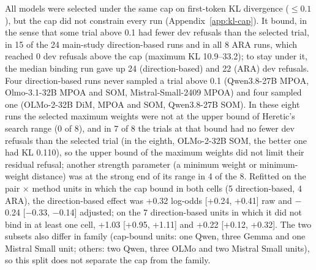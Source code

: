 All models were selected under the same cap on first-token KL divergence
($\le 0.1$), but the cap did not constrain every run
(Appendix~\ref{app:kl-cap}). It bound, in the sense that some trial above 0.1
had fewer dev refusals than the selected trial, in 15 of the 24 main-study
direction-based runs and in all 8 ARA runs, which reached 0 dev refusals above
the cap (maximum KL 10.9--33.2); to stay under it, the median binding run gave
up 24 (direction-based) and 22 (ARA) dev refusals. Four direction-based runs
never sampled a trial above 0.1 (Qwen3.8-27B MPOA, Olmo-3.1-32B MPOA and SOM,
Mistral-Small-2409 MPOA) and four sampled one (OLMo-2-32B DiM, MPOA and SOM,
Qwen3.8-27B SOM). In these eight runs the selected maximum weights were not at
the upper bound of Heretic's search range (0 of 8), and in 7 of 8 the trials
at that bound had no fewer dev refusals than the selected trial (in the
eighth, OLMo-2-32B SOM, the better one had KL 0.110), so the upper bound of
the maximum weights did not limit their residual refusal; another strength
parameter (a minimum weight or minimum-weight distance) was at the strong end
of its range in 4 of the 8. Refitted on the pair $\times$ method
units in which the cap bound in both cells (5 direction-based, 4 ARA), the
direction-based effect was +0.32 log-odds [+0.24, +0.41] raw and $-$0.24
[$-$0.33, $-$0.14] adjusted; on the 7 direction-based units in which it did
not bind in at least one cell, +1.03 [+0.95, +1.11] and +0.22 [+0.12,
+0.32]. The two subsets also differ in family (cap-bound units: one Qwen, three
Gemma and one Mistral Small unit; others: two Qwen, three OLMo and two Mistral
Small units), so this split does not separate the cap from the family.

